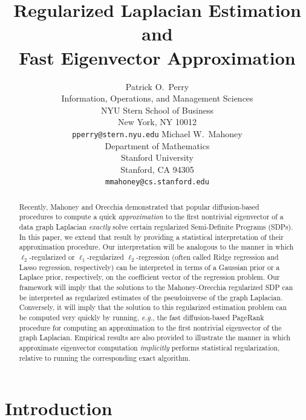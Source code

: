 \documentclass[12pt]{article}
\title{
  Regularized Laplacian Estimation
  and \\ Fast Eigenvector Approximation
}
\author{
  Patrick O.~Perry \\
  Information, Operations, and Management Sciences \\
  NYU Stern School of Business \\
  New York, NY 10012 \\
  \texttt{pperry@stern.nyu.edu} 
  \And
  Michael W.~Mahoney \\
  Department of Mathematics \\
  Stanford University \\
  Stanford, CA 94305  \\
  \texttt{mmahoney@cs.stanford.edu}
}
\theoremstyle{plain}
\begin{document}
\maketitle

\vspace{-8mm}
\begin{abstract}
Recently, Mahoney and Orecchia demonstrated that popular diffusion-based 
procedures to compute a quick \emph{approximation} to the first nontrivial 
eigenvector of a data graph Laplacian \emph{exactly} solve certain 
regularized Semi-Definite Programs (SDPs). 
In this paper, we extend that result by providing a statistical 
interpretation of their approximation procedure.
Our interpretation will be analogous to the manner in which
$\ell_2$-regularized or $\ell_1$-regularized $\ell_2$-regression (often
called Ridge regression and Lasso regression, respectively) can be
interpreted in terms of a Gaussian prior or a Laplace prior, respectively,
on the coefficient vector of the regression problem.
Our framework will imply that the solutions to the Mahoney-Orecchia 
regularized SDP can be interpreted as regularized estimates of the 
pseudoinverse of the graph Laplacian.
Conversely, it will imply that the solution to this regularized estimation 
problem can be computed very quickly by running, \emph{e.g.}, the fast 
diffusion-based PageRank procedure for computing an approximation to the 
first nontrivial eigenvector of the graph Laplacian.
Empirical results are also provided to illustrate the manner in which 
approximate eigenvector computation \emph{implicitly} performs statistical 
regularization, relative to running the corresponding exact algorithm.
\end{abstract}


\vspace{-5mm}
\section{Introduction}
\label{sxn:intro}
\end{document}
